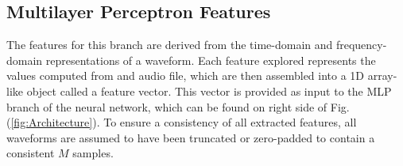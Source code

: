 \documentclass[conference,onecolumn,letterpaper]{IEEEtran}
\begin{document}

\subsection{Multilayer Perceptron Features}
\label{subsec:FeaturesMLP}

The features for this branch are derived from the time-domain and frequency-domain representations of a waveform. Each feature explored represents the values computed from and audio file, which are then assembled into a 1D array-like object called a feature vector. This vector is provided as input to the MLP branch of the neural network, which can be found on right side of Fig. (\ref{fig:Architecture}). To ensure a consistency of all extracted features, all waveforms are assumed to have been truncated or zero-padded to contain a consistent $M$ samples.
\end{document}
